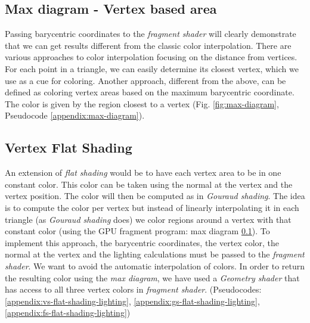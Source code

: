 
\subsection{Max diagram - Vertex based area} \label{section:max-diagram}
Passing barycentric coordinates to the \textit{fragment shader} will clearly demonstrate that we can get results different from the classic color interpolation.\cite{WEBSITE:redbloggames}
There are various approaches to color interpolation focusing on the distance from vertices. For each point in a triangle, we can easily determine its closest vertex, which we use as a cue for coloring.
Another approach, different from the above, can be defined as coloring vertex areas based on the maximum barycentric coordinate.
The color is given by the region closest to a vertex (Fig. \ref{fig:max-diagram}, Pseudocode \ref{appendix:max-diagram}).


\subsection{Vertex Flat Shading} \label{section:extend-flat-shading-lighting}
An extension of \textit{flat shading} would be to have each vertex area to be in one constant color. This color can be taken using the normal at the vertex and the vertex position.
The color will then be computed as in \textit{Gouraud shading}.
The idea is to compute the color per vertex but instead of linearly interpolating it in each triangle (as \textit{Gouraud shading} does) we color regions around a vertex with that constant color (using the GPU fragment program: max diagram \ref{section:max-diagram}).
To implement this approach, the barycentric coordinates, the vertex color, the normal at the vertex and the lighting calculations must be passed to the \textit{fragment shader}.
We want to avoid the automatic interpolation of colors. In order to return the resulting color using the \textit{max diagram}, we have used a \textit{Geometry shader} that has access to all three vertex colors in \textit{fragment shader}. (Pseudocodes: \ref{appendix:vs-flat-shading-lighting}, \ref{appendix:gs-flat-shading-lighting}, \ref{appendix:fs-flat-shading-lighting})

